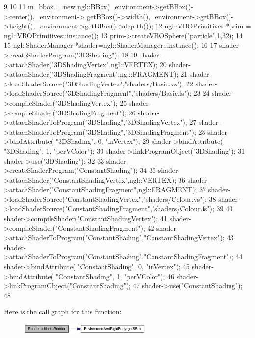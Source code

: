 \begin{DoxyCode}
9 {
10 
11     m_bbox = new ngl::BBox(_environment->getBBox()->center(),_environment->
      getBBox()->width(),_environment->getBBox()->height(),_environment->getBBox()->dep
      th());
12     ngl::VBOPrimitives *prim =  ngl::VBOPrimitives::instance();
13     prim->createVBOSphere("particle",1,32);
14 
15     ngl::ShaderManager *shader=ngl::ShaderManager::instance();
16 
17     shader->createShaderProgram("3DShading");
18 
19     shader->attachShader("3DShadingVertex",ngl::VERTEX);
20     shader->attachShader("3DShadingFragment",ngl::FRAGMENT);
21     shader->loadShaderSource("3DShadingVertex","shaders/Basic.vs");
22     shader->loadShaderSource("3DShadingFragment","shaders/Basic.fs");
23 
24     shader->compileShader("3DShadingVertex");
25     shader->compileShader("3DShadingFragment");
26     shader->attachShaderToProgram("3DShading","3DShadingVertex");
27     shader->attachShaderToProgram("3DShading","3DShadingFragment");
28     shader->bindAttribute( "3DShading", 0, "inVertex");
29     shader->bindAttribute( "3DShading", 1, "perVColor");
30     shader->linkProgramObject("3DShading");
31     shader->use("3DShading");
32 
33     shader->createShaderProgram("ConstantShading");
34 
35     shader->attachShader("ConstantShadingVertex",ngl::VERTEX);
36     shader->attachShader("ConstantShadingFragment",ngl::FRAGMENT);
37     shader->loadShaderSource("ConstantShadingVertex","shaders/Colour.vs");
38     shader->loadShaderSource("ConstantShadingFragment","shaders/Colour.fs");
39 
40     shader->compileShader("ConstantShadingVertex");
41     shader->compileShader("ConstantShadingFragment");
42     shader->attachShaderToProgram("ConstantShading","ConstantShadingVertex");
43     shader->attachShaderToProgram("ConstantShading","ConstantShadingFragment");
44     shader->bindAttribute( "ConstantShading", 0, "inVertex");
45     shader->bindAttribute( "ConstantShading", 1, "perVColor");
46     shader->linkProgramObject("ConstantShading");
47     shader->use("ConstantShading");
48 }
\end{DoxyCode}




Here is the call graph for this function:\nopagebreak
\begin{figure}[H]
\begin{center}
\leavevmode
\includegraphics[width=187pt]{class_render_a52ff4b4560ad5ef64c8babfc2132e7c0_cgraph}
\end{center}
\end{figure}




